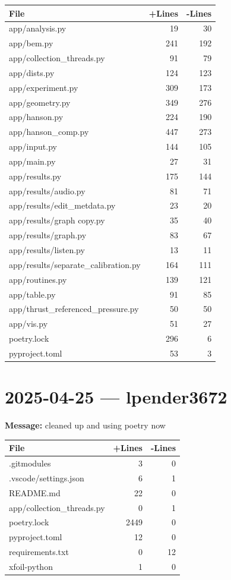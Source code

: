 \documentclass{article}
\begin{document}
\begin{longtable}{|p{10cm}|r|r|}
\hline \textbf{File} & \textbf{+Lines} & \textbf{-Lines} \\
\hline
app/analysis.py & 19 & 30 \\
\hline
app/bem.py & 241 & 192 \\
\hline
app/collection\_threads.py & 91 & 79 \\
\hline
app/dists.py & 124 & 123 \\
\hline
app/experiment.py & 309 & 173 \\
\hline
app/geometry.py & 349 & 276 \\
\hline
app/hanson.py & 224 & 190 \\
\hline
app/hanson\_comp.py & 447 & 273 \\
\hline
app/input.py & 144 & 105 \\
\hline
app/main.py & 27 & 31 \\
\hline
app/results.py & 175 & 144 \\
\hline
app/results/audio.py & 81 & 71 \\
\hline
app/results/edit\_metdata.py & 23 & 20 \\
\hline
app/results/graph copy.py & 35 & 40 \\
\hline
app/results/graph.py & 83 & 67 \\
\hline
app/results/listen.py & 13 & 11 \\
\hline
app/results/separate\_calibration.py & 164 & 111 \\
\hline
app/routines.py & 139 & 121 \\
\hline
app/table.py & 91 & 85 \\
\hline
app/thrust\_referenced\_pressure.py & 50 & 50 \\
\hline
app/vis.py & 51 & 27 \\
\hline
poetry.lock & 296 & 6 \\
\hline
pyproject.toml & 53 & 3 \\
\hline
\end{longtable}

\section*{2025-04-25 --- lpender3672}
\textbf{Message:} cleaned up and using poetry now

\begin{longtable}{|p{10cm}|r|r|}
\hline \textbf{File} & \textbf{+Lines} & \textbf{-Lines} \\
\hline
.gitmodules & 3 & 0 \\
\hline
.vscode/settings.json & 6 & 1 \\
\hline
README.md & 22 & 0 \\
\hline
app/collection\_threads.py & 0 & 1 \\
\hline
poetry.lock & 2449 & 0 \\
\hline
pyproject.toml & 12 & 0 \\
\hline
requirements.txt & 0 & 12 \\
\hline
xfoil-python & 1 & 0 \\
\hline
\end{longtable}
\end{document}
